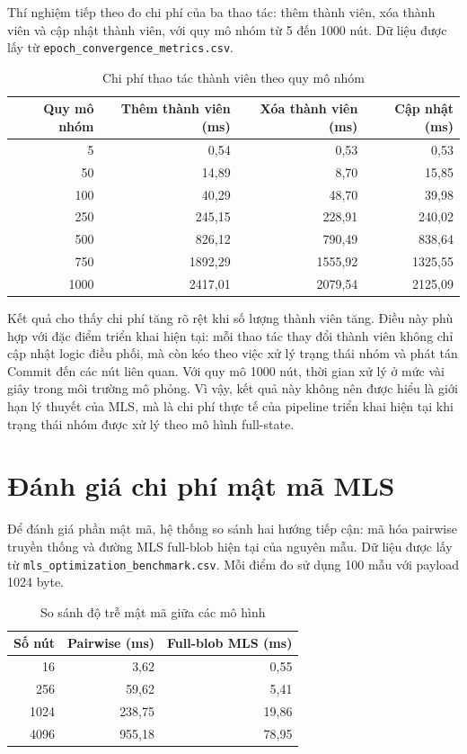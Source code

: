 \documentclass[../DoAn.tex]{subfiles}
\begin{document}
	Thí nghiệm tiếp theo đo chi phí của ba thao tác: thêm thành viên, xóa thành viên và cập nhật thành viên, với quy mô nhóm từ 5 đến 1000 nút. Dữ liệu được lấy từ \texttt{epoch\_convergence\_metrics.csv}.
	
	\begin{table}[htbp]
		\centering
		\caption{Chi phí thao tác thành viên theo quy mô nhóm}
		\label{tab:epoch_convergence_metrics}
		\begin{tabular}{|r|r|r|r|}
			\hline
			\textbf{Quy mô nhóm} & \textbf{Thêm thành viên (ms)} & \textbf{Xóa thành viên (ms)} & \textbf{Cập nhật (ms)} \\
			\hline
			5 & 0,54 & 0,53 & 0,53 \\
			\hline
			50 & 14,89 & 8,70 & 15,85 \\
			\hline
			100 & 40,29 & 48,70 & 39,98 \\
			\hline
			250 & 245,15 & 228,91 & 240,02 \\
			\hline
			500 & 826,12 & 790,49 & 838,64 \\
			\hline
			750 & 1892,29 & 1555,92 & 1325,55 \\
			\hline
			1000 & 2417,01 & 2079,54 & 2125,09 \\
			\hline
		\end{tabular}
	\end{table}
	
	Kết quả cho thấy chi phí tăng rõ rệt khi số lượng thành viên tăng. Điều này phù hợp với đặc điểm triển khai hiện tại: mỗi thao tác thay đổi thành viên không chỉ cập nhật logic điều phối, mà còn kéo theo việc xử lý trạng thái nhóm và phát tán Commit đến các nút liên quan. Với quy mô 1000 nút, thời gian xử lý ở mức vài giây trong môi trường mô phỏng. Vì vậy, kết quả này không nên được hiểu là giới hạn lý thuyết của MLS, mà là chi phí thực tế của pipeline triển khai hiện tại khi trạng thái nhóm được xử lý theo mô hình full-state.
	
	\section{Đánh giá chi phí mật mã MLS}
	\label{sec:danh_gia_crypto}
	
	Để đánh giá phần mật mã, hệ thống so sánh hai hướng tiếp cận: mã hóa pairwise truyền thống và đường MLS full-blob hiện tại của nguyên mẫu. Dữ liệu được lấy từ \texttt{mls\_optimization\_benchmark.csv}. Mỗi điểm đo sử dụng 100 mẫu với payload 1024 byte.
	
	\begin{table}[htbp]
		\centering
		\caption{So sánh độ trễ mật mã giữa các mô hình}
		\label{tab:mls_crypto_benchmark}
		\begin{tabular}{|r|r|r|}
			\hline
			\textbf{Số nút} & \textbf{Pairwise (ms)} & \textbf{Full-blob MLS (ms)} \\
			\hline
			16 & 3,62 & 0,55 \\
			\hline
			256 & 59,62 & 5,41 \\
			\hline
			1024 & 238,75 & 19,86 \\
			\hline
			4096 & 955,18 & 78,95 \\
			\hline
		\end{tabular}
	\end{table}
	
\end{document}
